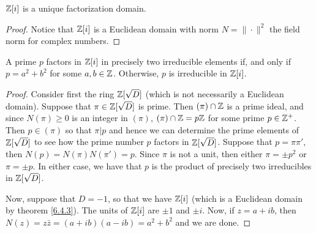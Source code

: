 \begin{theorem}\label{lemma_6.4.3}
  $\mathbb{Z}[i]$ is a unique factorization domain.
\end{theorem}
\begin{proof}
  Notice that $\mathbb{Z}[i]$ is a Euclidean domain with norm $N=\|\cdot\|^2$ the
  field norm for complex numbers.
\end{proof}
\begin{corollary}
  A prime $p$ factors in  $\mathbb{Z}[i]$ in precisely two irreducible elements if,
  and only if $p=a^2+b^2$ for some  $a,b \in \mathbb{Z}$. Otherwise,  $p$ is
  irreducible in  $\mathbb{Z}[i]$.
\end{corollary}
\begin{proof}
  Consider first the ring $\mathbb{Z}[\sqrt{D}]$ (which is not necessarily a Euclidean
  domain). Suppose that $\pi \in \mathbb{Z}[\sqrt{D}]$ is prime. Then $(\pi) \cap \mathbb{Z}$
  is a prime ideal, and since $N(\pi) \geq 0$ is an integer in $(\pi)$, $(\pi)
  \cap \mathbb{Z}=p\mathbb{Z}$ for some prime $p \in \mathbb{Z}^+$. Then  $p \in (\pi)$ so that
  $\pi|p$ and hence we can determine the prime elements of  $\mathbb{Z}[\sqrt{D}]$ to
  see how the prime number $p$ factors in $\mathbb{Z}[\sqrt{D}]$. Suppose that
  $p=\pi\pi'$, then  $N(p)=N(\pi)N(\pi')=p$. Since $\pi$ is not a unit, then
  either  $\pi=\pm p^2$ or $\pi=\pm p$. In either case, we have that $p$ is
  the product of precisely two irreducibles in $\mathbb{Z}[\sqrt{D}]$.

  Now, suppose that $D=-1$, so that we have  $\mathbb{Z}[i]$ (which is a Euclidean
  domain by theorem \ref{6.4.3}). The units of $\mathbb{Z}[i]$ are $\pm 1$ and  $\pm
  i$. Now, if  $z=a+ib$, then  $N(z)=z\bar{z}=(a+ib)(a-ib)=a^2+b^2$ and we are
  done.
\end{proof}

